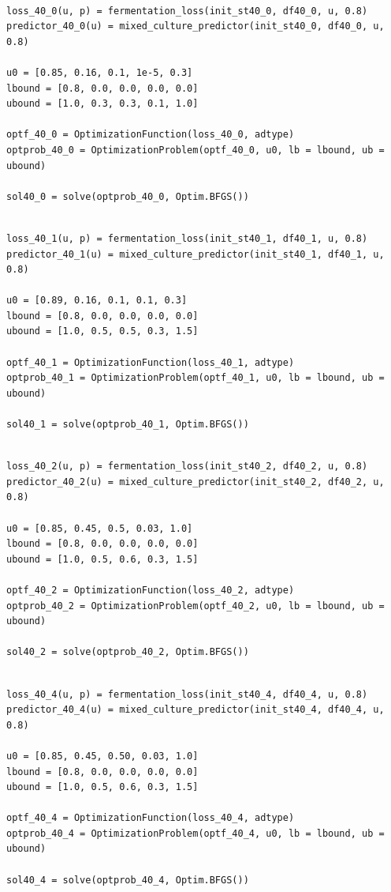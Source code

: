 \documentclass[11pt]{article}
\begin{document}
\begin{verbatim}

loss_40_0(u, p) = fermentation_loss(init_st40_0, df40_0, u, 0.8)
predictor_40_0(u) = mixed_culture_predictor(init_st40_0, df40_0, u, 0.8)

u0 = [0.85, 0.16, 0.1, 1e-5, 0.3]
lbound = [0.8, 0.0, 0.0, 0.0, 0.0]
ubound = [1.0, 0.3, 0.3, 0.1, 1.0]

optf_40_0 = OptimizationFunction(loss_40_0, adtype)
optprob_40_0 = OptimizationProblem(optf_40_0, u0, lb = lbound, ub = ubound)

sol40_0 = solve(optprob_40_0, Optim.BFGS())
\end{verbatim}

\begin{verbatim}

loss_40_1(u, p) = fermentation_loss(init_st40_1, df40_1, u, 0.8)
predictor_40_1(u) = mixed_culture_predictor(init_st40_1, df40_1, u, 0.8)

u0 = [0.89, 0.16, 0.1, 0.1, 0.3]
lbound = [0.8, 0.0, 0.0, 0.0, 0.0]
ubound = [1.0, 0.5, 0.5, 0.3, 1.5]

optf_40_1 = OptimizationFunction(loss_40_1, adtype)
optprob_40_1 = OptimizationProblem(optf_40_1, u0, lb = lbound, ub = ubound)

sol40_1 = solve(optprob_40_1, Optim.BFGS())
\end{verbatim}

\begin{verbatim}

loss_40_2(u, p) = fermentation_loss(init_st40_2, df40_2, u, 0.8)
predictor_40_2(u) = mixed_culture_predictor(init_st40_2, df40_2, u, 0.8)

u0 = [0.85, 0.45, 0.5, 0.03, 1.0]
lbound = [0.8, 0.0, 0.0, 0.0, 0.0]
ubound = [1.0, 0.5, 0.6, 0.3, 1.5]

optf_40_2 = OptimizationFunction(loss_40_2, adtype)
optprob_40_2 = OptimizationProblem(optf_40_2, u0, lb = lbound, ub = ubound)

sol40_2 = solve(optprob_40_2, Optim.BFGS())
\end{verbatim}

\begin{verbatim}

loss_40_4(u, p) = fermentation_loss(init_st40_4, df40_4, u, 0.8)
predictor_40_4(u) = mixed_culture_predictor(init_st40_4, df40_4, u, 0.8)

u0 = [0.85, 0.45, 0.50, 0.03, 1.0]
lbound = [0.8, 0.0, 0.0, 0.0, 0.0]
ubound = [1.0, 0.5, 0.6, 0.3, 1.5]

optf_40_4 = OptimizationFunction(loss_40_4, adtype)
optprob_40_4 = OptimizationProblem(optf_40_4, u0, lb = lbound, ub = ubound)

sol40_4 = solve(optprob_40_4, Optim.BFGS())
\end{verbatim}
\end{document}
